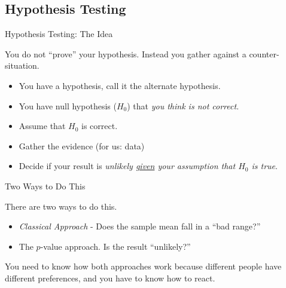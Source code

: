 \subsection{Hypothesis Testing}

\begin{frame}{Hypothesis Testing: The Idea}

  You do not ``prove'' your hypothesis. Instead you gather
   against a counter-situation.

  \begin{itemize}
  \item You have a hypothesis, call it the alternate hypothesis.
  \item You have null hypothesis ($H_0$) that \textit{\color{red}you think is not correct}.
  \item Assume that $H_0$ is correct.
  \item Gather the evidence (for us: data)
  \item Decide if your result is \textit{\color{red}unlikely \underline{given}
      your assumption that $H_0$ is true}.
  \end{itemize}


\end{frame}

\begin{frame}{Two Ways to Do This}

    There are two ways to do this. 

    \begin{itemize}
    \item \textit{Classical Approach} - Does the sample mean fall in a
      ``bad range?''
    \item The $p$-value approach. Is the result ``unlikely?''
    \end{itemize}

    You need to know how both approaches work because different people
    have different preferences, and you have to know how to react.
  
\end{frame}

